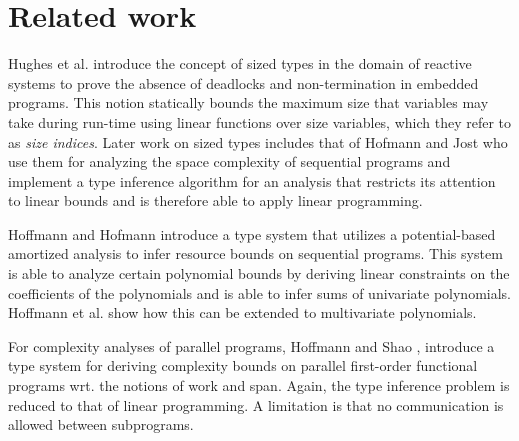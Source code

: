 \section{Related work}\label{sec:relatedwork}

Hughes et al. \cite{HughesEtAl1996} introduce the concept of sized types in the domain of reactive systems to prove the absence of deadlocks and non-termination in embedded programs. This notion statically bounds the maximum size that variables may take during run-time using linear functions over size variables, which they refer to as \textit{size indices}. Later work on sized types includes that of Hofmann and Jost \cite{HofmannAndJost2003} who use them for analyzing the space complexity of sequential programs and implement a type inference algorithm for an analysis that restricts its attention to linear bounds and is therefore able to apply linear programming.

Hoffmann and Hofmann \cite{HofmannAndHoffmann2010} introduce a type system that utilizes a potential-based amortized analysis to infer resource bounds on sequential programs. This system is able to analyze certain polynomial bounds by deriving linear constraints on the coefficients of the polynomials and is able to infer sums of univariate polynomials. Hoffmann et al. \cite{HoffmannEtAl2012} show how this can be extended to multivariate polynomials.


For complexity analyses of parallel programs,  Hoffmann and Shao \cite{HoffmannShao2015}, introduce a type system for deriving complexity bounds on parallel first-order functional programs wrt. the notions of work and span. Again, the type inference problem is reduced to that of linear programming. A limitation is that no communication is allowed between subprograms.


